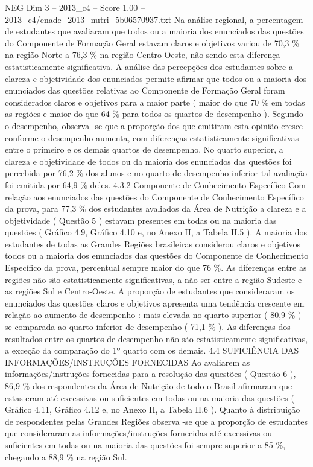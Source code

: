 \begin{textsample}{NEG Dim 3 – 2013\_c4 – Score 1.00 – 2013\_c4/enade\_2013\_nutri\_5b06570937.txt}
Na análise regional, a percentagem de estudantes que avaliaram que todos ou a maioria dos enunciados das questões do Componente de Formação Geral estavam claros e objetivos variou de 70,3 \% na região Norte a 76,3 \% na região Centro-Oeste, não sendo esta diferença estatisticamente significativa.
A análise das percepções dos estudantes sobre a clareza e objetividade dos enunciados permite afirmar que todos ou a maioria dos enunciados das questões relativas ao Componente de Formação Geral foram considerados claros e objetivos para a maior parte ( maior do que 70 \% em todas as regiões e maior do que 64 \% para todos os quartos de desempenho ).
Segundo o desempenho, observa -se que a proporção dos que emitiram esta opinião cresce conforme o desempenho aumenta, com diferenças estatisticamente significativas entre o primeiro e os demais quartos de desempenho.
No quarto superior, a clareza e objetividade de todos ou da maioria dos enunciados das questões foi percebida por 76,2 \% dos alunos e no quarto de desempenho inferior tal avaliação foi emitida por 64,9 \% deles. 4.3.2 Componente de Conhecimento Específico Com relação aos enunciados das questões do Componente de Conhecimento Específico da prova, para 77,3 \% dos estudantes avaliados da Área de Nutrição a clareza e a objetividade ( Questão 5 ) estavam presentes em todas ou na maioria das questões ( Gráfico 4.9, Gráfico 4.10 e, no Anexo II, a Tabela II.5 ).
A maioria dos estudantes de todas as Grandes Regiões brasileiras considerou claros e objetivos todos ou a maioria dos enunciados das questões do Componente de Conhecimento Específico da prova, percentual sempre maior do que 76 \%.
As diferenças entre as regiões não são estatisticamente significativas, a não ser entre a região Sudeste e as regiões Sul e Centro-Oeste.
A proporção de estudantes que consideraram os enunciados das questões claros e objetivos apresenta uma tendência crescente em relação ao aumento de desempenho : mais elevada no quarto superior ( 80,9 \% ) se comparada ao quarto inferior de desempenho ( 71,1 \% ).
As diferenças dos resultados entre os quartos de desempenho não são estatisticamente significativas, a exceção da comparação do 1º quarto com os demais. 4.4 SUFICIÊNCIA DAS INFORMAÇÕES/INSTRUÇÕES FORNECIDAS Ao avaliarem as informações/instruções fornecidas para a resolução das questões ( Questão 6 ), 86,9 \% dos respondentes da Área de Nutrição de todo o Brasil afirmaram que estas eram até excessivas ou suficientes em todas ou na maioria das questões ( Gráfico 4.11, Gráfico 4.12 e, no Anexo II, a Tabela II.6 ).
Quanto à distribuição de respondentes pelas Grandes Regiões observa -se que a proporção de estudantes que consideraram as informações/instruções fornecidas até excessivas ou suficientes em todas ou na maioria das questões foi sempre superior a 85 \%, chegando a 88,9 \% na região Sul.

\end{textsample}
